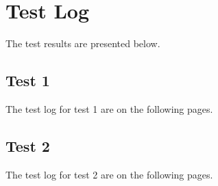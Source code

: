 
\chapter{Test Log}
\label{loc:TestLog}


The test results are presented below.

\section{Test 1}
\label{loc:TestOneResults}

The test log for test 1 are on the following pages.


\newpage
\addtocounter{page}{2}%
\section{Test 2}
\label{loc:TestTwoResults}

The test log for test 2 are on the following pages.

\newpage
\addtocounter{page}{3}%